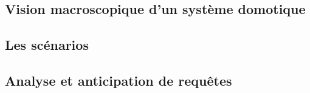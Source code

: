	\subsection{Vision macroscopique d’un système domotique}
	\subsection{Les scénarios}
	\subsection{Analyse et anticipation de requêtes}
